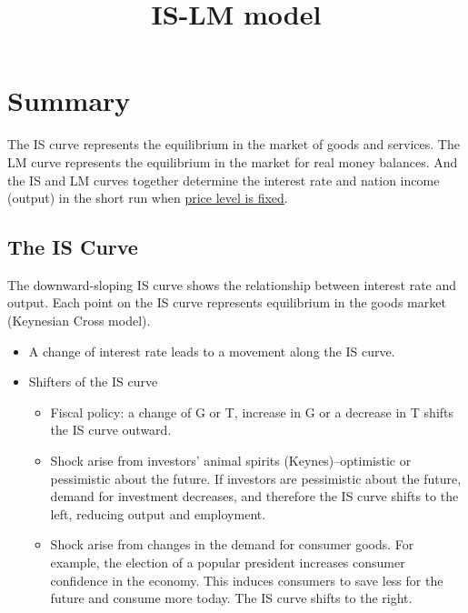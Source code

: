 \documentclass[10pt]{article}
\title{IS-LM model}
\author{}
\date{}
\begin{document}
\maketitle


\section{Summary}


The IS curve represents the equilibrium in the market of goods and services. The LM curve represents
the equilibrium in the market for real money balances. And the IS and LM curves together determine
the interest rate and nation income (output) in the short run when {\underline {price level
is fixed}}.


\subsection{The IS Curve}
The downward-sloping IS curve shows the relationship between interest rate and output. 
Each point on the IS curve  represents equilibrium in the goods market (Keynesian Cross model).
\begin{itemize}
\item A change of interest rate leads to a movement along the IS curve.
\item Shifters of the IS curve
		\begin{itemize}
		\item Fiscal policy: a change of G or T, increase in G or a decrease in T shifts the IS curve 
				outward.
		\item Shock arise from investors' animal spirits (Keynes)--optimistic or pessimistic 
				about the future.
				If investors are pessimistic about the future, demand for investment decreases, and
				therefore the IS curve shifts to the left, reducing output and employment.
		\item Shock arise from changes in the demand for consumer goods. For example,
				the election of a popular president increases consumer confidence in the economy.
				This induces consumers to save less for the future and consume more today. The IS curve 
				shifts to the right.
		\end{itemize}
\end{itemize}
\end{document}
